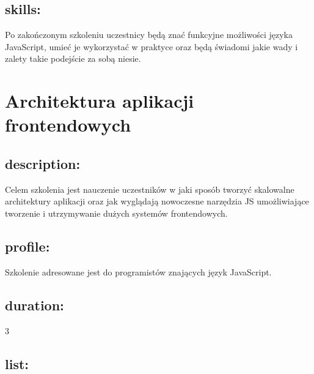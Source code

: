 \documentclass{article}[10pt]
\begin{document}
	\subsection*{skills:}
\begin{adjustwidth}{2cm}{}
	
Po zakończonym szkoleniu uczestnicy będą znać funkcyjne możliwości języka JavaScript, umieć je wykorzystać w praktyce oraz będą świadomi jakie wady i zalety takie podejście za sobą niesie.
\end{adjustwidth}

\newpage


    
	\section{Architektura aplikacji frontendowych}

	\subsection*{description:}
	\begin{adjustwidth}{2cm}{}
		Celem szkolenia jest nauczenie uczestników w jaki sposób tworzyć skalowalne architektury aplikacji oraz jak wyglądają nowoczesne narzędzia JS umożliwiające tworzenie i utrzymywanie dużych systemów frontendowych.
	\end{adjustwidth}
	\subsection*{profile:}
\begin{adjustwidth}{2cm}{}
	
Szkolenie adresowane jest do programistów znających język JavaScript.
\end{adjustwidth}
	\subsection*{duration:}
\begin{adjustwidth}{2cm}{}
	3
\end{adjustwidth}

	\subsection*{list:}
\begin{adjustwidth}{1.5cm}{}
	\begin{itemize}































	\end{itemize}
\end{adjustwidth}
\end{document}
